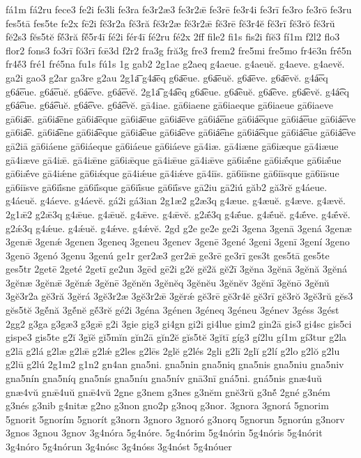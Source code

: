 {fá1m
fá2ru
fece3
fe2i
fe3li
fe3ra
fe3r2æ3
fe3r2ǣ
fe3rē
fe3r4i
fe3rī
fe3ro
fe3rō
fe3ru
fes5tā
fes5te
fe2x
fē2i
fĕ3r2a
fĕ3ră
fĕ3r2æ
fĕ3r2ǣ
fĕ3rē
fĕ3r4ĕ
fĕ3rī
fĕ3rŏ
fĕ3rŭ
fĕ2s3
fĕs5tĕ
fĕ́3ră
fĕ́5r4ī
fé2i
fér4ī
fé2ru
fé2x
2ff
file2
fi1s
fis2i
fĭĕ3
fí1m
f2l2
flo3
flor2
fons3
fo3rī
fŏ3rī
fœ̄3d
f2r2
fra3g
fră3g
fre3
frem2
fre5mi
fre5mo
fr4ē3n
frḗ5n
fr4ĕ́3
fré1
fré5na
fu1s
fú1s
1g
gab2
2g1ae
g2aeq
g4aeue.
g4aeuĕ.
g4aeve.
g4aevĕ.
ga2i
gao3
g2ar
ga3re
g2au
2g1a͞
g4a͞eq
g6a͞eue.
g6a͞euĕ.
g6a͞eve.
g6a͞evĕ.
g4á͞eq
g6á͞eue.
g6á͞euĕ.
g6á͞eve.
g6á͞evĕ.
2g1a͡
g4a͡eq
g6a͡eue.
g6a͡euĕ.
g6a͡eve.
g6a͡evĕ.
g4á͡eq
g6á͡eue.
g6á͡euĕ.
g6á͡eve.
g6á͡evĕ.
gā4iae.
gā6iaene
gā6iaeque
gā6iaeue
gā6iaeve
gā6ia͞e.
gā6ia͞ene
gā6ia͞eque
gā6ia͞eue
gā6ia͞eve
gā6iá͞ene
gā6iá͞eque
gā6iá͞eue
gā6iá͞eve
gā6ia͡e.
gā6ia͡ene
gā6ia͡eque
gā6ia͡eue
gā6ia͡eve
gā6iá͡ene
gā6iá͡eque
gā6iá͡eue
gā6iá͡eve
gā2iā
gā6iáene
gā6iáeque
gā6iáeue
gā6iáeve
gā4iæ.
gā4iæne
gā6iæque
gā4iæue
gā4iæve
gā4iǣ.
gā4iǣne
gā6iǣque
gā4iǣue
gā4iǣve
gā6iǣ́ne
gā6iǣ́que
gā6iǣ́ue
gā6iǣ́ve
gā4iǽne
gā6iǽque
gā4iǽue
gā4iǽve
gā4iīs.
gā6iīsne
gā6iīsque
gā6iīsue
gā6iīsve
gā6iī́sne
gā6iī́sque
gā6iī́sue
gā6iī́sve
gā2iu
gā2iú
găb2
gă3rĕ
g4áeue.
g4áeuĕ.
g4áeve.
g4áevĕ.
gá2i
gá3ian
2g1æ2
g2æ3q
g4æue.
g4æuĕ.
g4æve.
g4ævĕ.
2g1ǣ2
g2ǣ3q
g4ǣue.
g4ǣuĕ.
g4ǣve.
g4ǣvĕ.
g2ǣ́3q
g4ǣ́ue.
g4ǣ́uĕ.
g4ǣ́ve.
g4ǣ́vĕ.
g2ǽ3q
g4ǽue.
g4ǽuĕ.
g4ǽve.
g4ǽvĕ.
2gd
g2e
ge2e
ge2i
3gena
3genā
3gená
3genæ
3genǣ
3genǽ
3genen
3geneq
3geneu
3genev
3genē
3gené
3geni
3genī
3gení
3geno
3genō
3genó
3genu
3genú
ge1r
ger2æ3
ger2ǣ
ge3rē
ge3rī
ges3t
ges5tā
ges5te
ges5tr
2getē
2geté
2getī
ge2un
3gēd
gē2i
g2ĕ
gĕ2ă
gĕ2ī
3gĕna
3gĕnā
3gĕnă
3gĕná
3gĕnæ
3gĕnǣ
3gĕnǽ
3gĕnē
3gĕnĕn
3gĕnĕq
3gĕnĕu
3gĕnĕv
3gĕnī
3gĕnō
3gĕnŭ
3gĕ3r2a
gĕ3ră
3gĕrá
3gĕ3r2æ
3gĕ3r2ǣ
3gĕrǽ
gĕ3rē
gĕ3r4ĕ
gĕ3rī
gĕ3rŏ
3gĕ3rŭ
gĕs3
gĕs5tĕ
3gĕ́nă
3gĕ́nĕ
gĕ́3rĕ
gé2i
3géna
3génen
3géneq
3géneu
3génev
3géss
3gést
2gg2
g3ga
g3gæ3
g3gǣ
g2i
3gie
gig3
gi4gn
gi2i
gi4lue
gim2
gin2ā
gis3
gi4sc
gis5ci
gispe3
gis5te
g2ĭ
3gĭĕ
gĭ5mĭn
gĭn2ā
gĭn2ĕ
gĭs5tĕ
3gĭtī
gíg3
gí2lu
gí1m
gí3tur
g2la
g2lā
g2lá
g2læ
g2lǣ
g2lǽ
g2les
g2lēs
2glĕ
g2lés
2gli
g2lī
2glĭ
g2lí
g2lo
g2lŏ
g2lu
g2lū
g2lú
2g1m2
g1n2
gn4an
gna5ni.
gna5nin
gna5niq
gna5nis
gna5niu
gna5niv
gna5nín
gna5níq
gna5nís
gna5níu
gna5nív
gnā3nī
gná5ni.
gná5nis
gnæ4uŭ
gnæ4vŭ
gnǣ4uŭ
gnǣ4vŭ
2gne
g3nem
g3nes
g3nĕm
gnĕ3rŭ
g3nĕ́
2gné
g3ném
g3nés
g3nib
g4nitæ
g2no
g3non
gno2p
g3noq
g3nor.
3gnora
3gnorá
5gnorim
5gnorit
5gnorím
5gnorít
g3norn
3gnoro
3gnoró
g3norq
5gnorun
5gnorún
g3norv
3gnos
3gnou
3gnov
3g4nóra
5g4nóre.
5g4nórim
5g4nórin
5g4nóris
5g4nórit
3g4nóro
5g4nórun
3g4nósc
3g4nóss
3g4nóst
5g4nóuer
}

